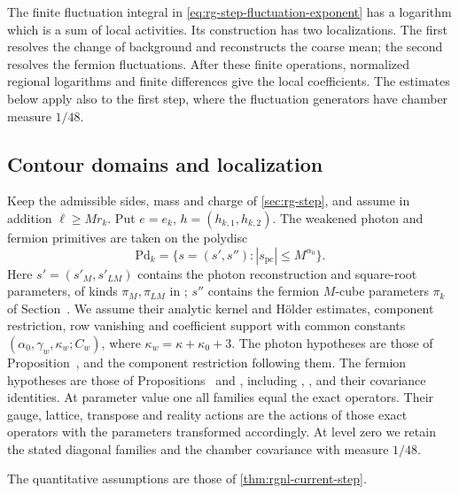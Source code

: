 The finite fluctuation integral in
\eqref{eq:rg-step-fluctuation-exponent} has a logarithm which is a
sum of local activities. Its construction has two localizations.
The first resolves the change of background and reconstructs
the coarse mean; the second resolves the fermion fluctuations.
After these finite operations, normalized regional logarithms
and finite differences give the local coefficients. The estimates below
apply also to the first step, where the fluctuation generators have chamber measure
$1/48$.

\subsection{Contour domains and localization}
\label{subsec:rgnl-domains}

Keep the admissible sides, mass and charge of
\cref{sec:rg-step}, and assume in addition
$\ell\ge Mr_k$. Put $e=e_k$, $h=(h_{k,1},h_{k,2})$.
The weakened photon and fermion primitives are taken on the
polydisc
\[
 \mathrm{Pd}_k=\{s=(s',s''):|s_{\mathrm{pc}}|\le M^{\alpha_0}\}.
\]
Here $s'=(s'_M,s'_{LM})$ contains the photon reconstruction
and square-root parameters, of kinds $\pi_M,\pi_{LM}$ in
; $s''$ contains the
fermion $M$-cube parameters $\pi_k$ of
Section~.
We assume their analytic kernel and H\"older estimates,
component restriction, row vanishing and coefficient support
with common constants $(\alpha_0,\gamma_w,\kappa_w;C_w)$,
where $\kappa_w=\kappa+\kappa_0+3$.
The photon hypotheses are those of
Proposition~,
 and the component
restriction following them. The fermion hypotheses are those of
Propositions~ and
, including
,
, and their covariance
identities. At parameter value one all families equal the
exact operators. Their gauge, lattice, transpose and reality
actions are the actions of those exact operators with the
parameters transformed accordingly. At level zero we retain
the stated diagonal families and the chamber covariance
with measure $1/48$.

The quantitative assumptions are those of \cref{thm:rgnl-current-step}.

